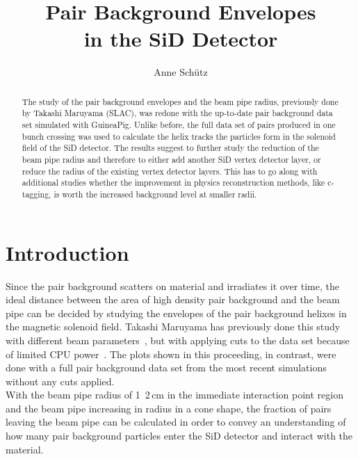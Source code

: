 \documentclass[12pt]{article}
\newcommand{\guineapig}{GuineaPig\xspace}
\begin{document}

\title{Pair Background Envelopes\\in the SiD Detector}

\author[1,2]{Anne Sch\"utz}


\maketitle

\linenumbers

\begin{abstract}
The study of the pair background envelopes and the beam pipe radius, previously done by Takashi Maruyama (SLAC), was redone with the up-to-date pair background data set simulated with \guineapig.
Unlike before, the full data set of pairs produced in one bunch crossing was used to calculate the helix tracks the particles form in the solenoid field of the SiD detector.
The results suggest to further study the reduction of the beam pipe radius and therefore to either add another SiD vertex detector layer, or reduce the radius of the existing vertex detector layers.
This has to go along with additional studies whether the improvement in physics reconstruction methods, like c-tagging, is worth the increased background level at smaller radii.
\end{abstract}


\section{Introduction}
\label{sec:introduction}
Since the pair background scatters on material and irradiates it over time, the ideal distance between the area of high density pair background and the beam pipe can be decided by studying the envelopes of the pair background helixes in the magnetic solenoid field.
Takashi Maruyama has previously done this study with different beam parameters~\cite{Takashi_plot}, but with applying cuts to the data set because of limited CPU power~\cite{Takashi}.
The plots shown in this proceeding, in contrast, were done with a full pair background data set from the most recent simulations without any cuts applied.\\
With the beam pipe radius of \unit{1.2}\,{cm} in the immediate interaction point region and the beam pipe increasing in radius in a cone shape, the fraction of pairs leaving the beam pipe can be calculated in order to convey an understanding of how many pair background particles enter the SiD detector and interact with the material. 
\end{document}
